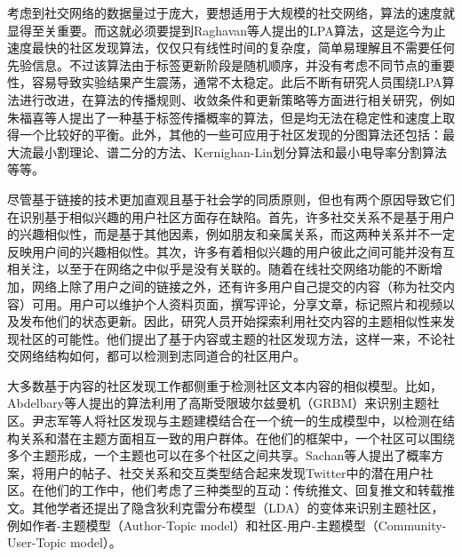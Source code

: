 考虑到社交网络的数据量过于庞大，要想适用于大规模的社交网络，算法的速度就显得至关重要。而这就必须要提到Raghavan等人提出的LPA算法\cite{Raghavan2007Near}，这是迄今为止速度最快的社区发现算法，仅仅只有线性时间的复杂度，简单易理解且不需要任何先验信息。不过该算法由于标签更新阶段是随机顺序，并没有考虑不同节点的重要性，容易导致实验结果产生震荡，通常不太稳定。此后不断有研究人员围绕LPA算法进行改进，在算法的传播规则、收敛条件和更新策略等方面进行相关研究，例如朱福喜等人提出了一种基于标签传播概率的算法\cite{Liu2016A}，但是均无法在稳定性和速度上取得一个比较好的平衡。此外，其他的一些可应用于社区发现的分图算法还包括：最大流最小割理论\cite{Jr2009Maximal}、谱二分的方法\cite{Pothen1990Partitioning}、Kernighan-Lin划分算法\cite{Kernigan1970An}和最小电导率分割算法\cite{Leskovec2005Graphs}等等。

尽管基于链接的技术更加直观且基于社会学的同质原则，但也有两个原因导致它们在识别基于相似兴趣的用户社区方面存在缺陷。首先，许多社交关系不是基于用户的兴趣相似性，而是基于其他因素，例如朋友和亲属关系，而这两种关系并不一定反映用户间的兴趣相似性。其次，许多有着相似兴趣的用户彼此之间可能并没有互相关注，以至于在网络之中似乎是没有关联的\cite{Deng2013Interaction}。随着在线社交网络功能的不断增加，网络上除了用户之间的链接之外，还有许多用户自己提交的内容（称为社交内容）可用。用户可以维护个人资料页面，撰写评论，分享文章，标记照片和视频以及发布他们的状态更新。因此，研究人员开始探索利用社交内容的主题相似性来发现社区的可能性。他们提出了基于内容或主题的社区发现方法，这样一来，不论社交网络结构如何，都可以检测到志同道合的社区用户\cite{Natarajan2013Community}。

大多数基于内容的社区发现工作都侧重于检测社区文本内容的相似模型。比如，Abdelbary等人提出的算法\cite{Abdelbary2014Utilizing}利用了高斯受限玻尔兹曼机（GRBM）来识别主题社区。尹志军等人\cite{Yin2012Latent}将社区发现与主题建模结合在一个统一的生成模型中，以检测在结构关系和潜在主题方面相互一致的用户群体。在他们的框架中，一个社区可以围绕多个主题形成，一个主题也可以在多个社区之间共享。Sachan等人\cite{Sachan2012Using}提出了概率方案，将用户的帖子、社交关系和交互类型结合起来发现Twitter中的潜在用户社区。在他们的工作中，他们考虑了三种类型的互动：传统推文、回复推文和转载推文。其他学者还提出了隐含狄利克雷分布模型（LDA）的变体来识别主题社区，例如作者-主题模型（Author-Topic model）\cite{RosenZvi2012The}和社区-用户-主题模型（Community-User-Topic model）\cite{Zhou2006Probabilistic}。

